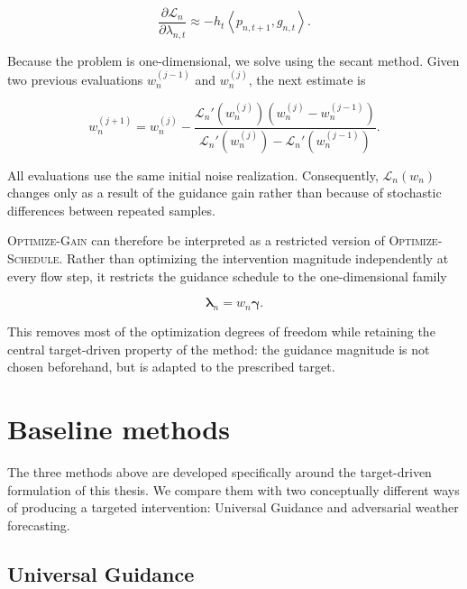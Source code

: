 \begin{equation}
    \frac{\partial \mathcal{L}_n}
         {\partial \lambda_{n,t}}
    \approx
    -h_t
    \left\langle
        p_{n,t+1},
        g_{n,t}
    \right\rangle.
    \label{eq:gain-lambda-gradient}
\end{equation}

Because the problem is one-dimensional, we solve
 using the secant method. Given two previous
evaluations $w_n^{(j-1)}$ and $w_n^{(j)}$, the next estimate is

\begin{equation}
    w_n^{(j+1)}
    =
    w_n^{(j)}
    -
    \frac{
        \mathcal{L}_n'(w_n^{(j)})
        \left(
            w_n^{(j)}-w_n^{(j-1)}
        \right)
    }{
        \mathcal{L}_n'(w_n^{(j)})
        -
        \mathcal{L}_n'(w_n^{(j-1)})
    }.
    \label{eq:secant-guidance-gain}
\end{equation}

All evaluations use the same initial noise realization. Consequently,
$\mathcal{L}_n(w_n)$ changes only as a result of the guidance gain rather than
because of stochastic differences between repeated samples.

\textsc{Optimize-Gain} can therefore be interpreted as a restricted version
of \textsc{Optimize-Schedule}. Rather than optimizing the intervention
magnitude independently at every flow step, it restricts the guidance schedule
to the one-dimensional family

\begin{equation}
    \boldsymbol{\lambda}_n
    =
    w_n
    \boldsymbol{\gamma}.
\end{equation}

This removes most of the optimization degrees of freedom while retaining the
central target-driven property of the method: the guidance magnitude is not
chosen beforehand, but is adapted to the prescribed target.

\section{Baseline methods}
\label{sec:guidance-baselines}

The three methods above are developed specifically around the target-driven
formulation of this thesis. We compare them with two conceptually different
ways of producing a targeted intervention: Universal Guidance and adversarial
weather forecasting.

\subsection{Universal Guidance}
\label{sec:universal-guidance-baseline}

